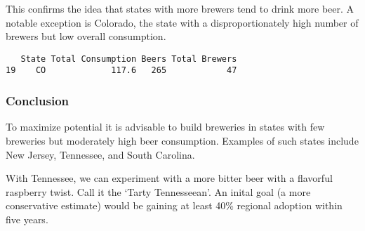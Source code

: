 \documentclass[]{article}
\newenvironment{Shaded}{\begin{snugshade}}{\end{snugshade}}
\newcommand{\DataTypeTok}[1]{\textcolor[rgb]{0.13,0.29,0.53}{#1}}
\newcommand{\DecValTok}[1]{\textcolor[rgb]{0.00,0.00,0.81}{#1}}
\newcommand{\KeywordTok}[1]{\textcolor[rgb]{0.13,0.29,0.53}{\textbf{#1}}}
\newcommand{\NormalTok}[1]{#1}
\newcommand{\OperatorTok}[1]{\textcolor[rgb]{0.81,0.36,0.00}{\textbf{#1}}}
\newcommand{\StringTok}[1]{\textcolor[rgb]{0.31,0.60,0.02}{#1}}
\begin{document}
This confirms the idea that states with more brewers tend to drink more
beer. A notable exception is Colorado, the state with a
disproportionately high number of brewers but low overall consumption.

\begin{Shaded}
\end{Shaded}

\begin{verbatim}
   State Total Consumption Beers Total Brewers
19    CO             117.6   265            47
\end{verbatim}

\hypertarget{conclusion}{%
\subsubsection{Conclusion}\label{conclusion}}

To maximize potential it is advisable to build breweries in states with
few breweries but moderately high beer consumption. Examples of such
states include New Jersey, Tennessee, and South Carolina.

With Tennessee, we can experiment with a more bitter beer with a
flavorful raspberry twist. Call it the `Tarty Tennesseean'. An inital
goal (a more conservative estimate) would be gaining at least 40\%
regional adoption within five years.
\end{document}
